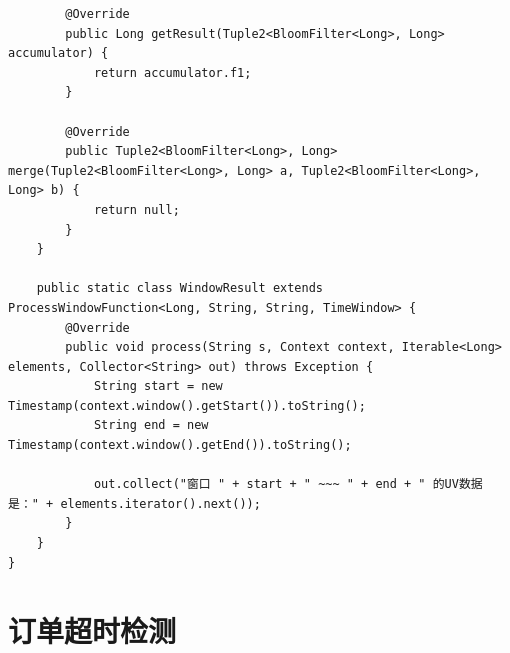 \documentclass[cn,11pt,chinese]{elegantbook}
\begin{document}
\begin{verbatim}
        @Override
        public Long getResult(Tuple2<BloomFilter<Long>, Long> accumulator) {
            return accumulator.f1;
        }

        @Override
        public Tuple2<BloomFilter<Long>, Long> merge(Tuple2<BloomFilter<Long>, Long> a, Tuple2<BloomFilter<Long>, Long> b) {
            return null;
        }
    }

    public static class WindowResult extends ProcessWindowFunction<Long, String, String, TimeWindow> {
        @Override
        public void process(String s, Context context, Iterable<Long> elements, Collector<String> out) throws Exception {
            String start = new Timestamp(context.window().getStart()).toString();
            String end = new Timestamp(context.window().getEnd()).toString();

            out.collect("窗口 " + start + " ~~~ " + end + " 的UV数据是：" + elements.iterator().next());
        }
    }
}
\end{verbatim}

\section{订单超时检测}
\end{document}
